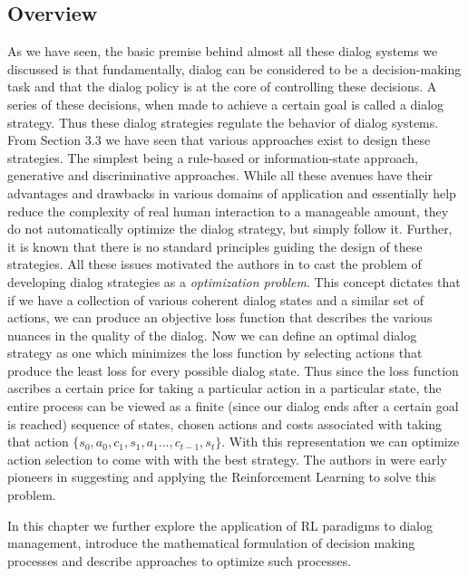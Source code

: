 \documentclass[14pt]{extarticle}
\numberwithin{equation}{section}
\begin{document}
	\subsection{Overview}
	As we have seen, the basic premise behind almost all these dialog systems we discussed is that fundamentally, dialog can be considered to be a decision-making task and that the dialog policy is at the core of controlling these decisions. A series of these decisions, when made to achieve a certain goal is called a dialog strategy. Thus these dialog strategies regulate the behavior of dialog systems. From Section 3.3 we have seen that various approaches exist to design these strategies. The simplest being a rule-based or information-state approach, generative and discriminative approaches.  While all these avenues have their advantages and drawbacks in various domains of application and essentially help reduce the complexity of real human interaction to a manageable amount, they do not automatically optimize the dialog strategy, but simply follow it. Further, it is known that there is no standard principles guiding the design of these strategies. All these issues motivated the authors in \cite{Levin97astochastic} to cast the problem of developing dialog strategies as a \textit{optimization problem}. This concept dictates that if we have a collection of various coherent dialog states and a similar set of actions, we can produce an objective loss function that describes the various nuances in the quality of the dialog. Now we can define an optimal dialog strategy as one which minimizes the loss function by selecting actions that produce the least loss for every possible dialog state. Thus since the loss function ascribes a certain price for taking a particular action in a particular state, the entire process can be viewed as a finite (since our dialog ends after a certain goal is reached) sequence of states, chosen actions and costs associated with taking that action $\{s_0,a_0,c_1,s_1,a_1...,c_{t-1},s_t\}$. With this representation we can optimize action selection to come with with the best strategy. The authors in \cite{Levin97astochastic}\cite{mdp-pieraccini} were early pioneers in suggesting and applying the Reinforcement Learning to solve this problem. \par
	In this chapter we further explore the application of RL paradigms to dialog management, introduce the mathematical formulation of decision making processes and describe approaches to optimize such processes.
\end{document}
